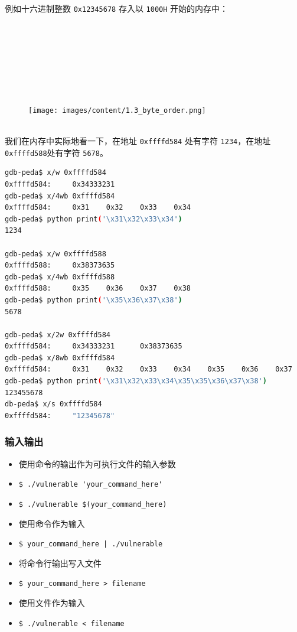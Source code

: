 \indent 例如十六进制整数 \verb+0x12345678+ 存入以 \verb+1000H+ 开始的内存中：
\indent \ \\
\indent \ \\
\indent \ \\
\indent \ \\
\indent \ \\
\indent \ \\
\indent \ \\
\begin{figure}[ht]
    \indent \\
    \texttt{[image: images/content/1.3\_byte\_order.png]}
    \label{fig:字节序}
\end{figure}
\indent \\
\indent 我们在内存中实际地看一下，在地址 \verb+0xffffd584+ 处有字符 \verb+1234+，在地址 \verb+0xffffd588+处有字符 \verb+5678+。
\begin{lstlisting}[language=bash, style=customStyleBashDark, caption=内存中的字节]
gdb-peda$ x/w 0xffffd584
0xffffd584:     0x34333231
gdb-peda$ x/4wb 0xffffd584
0xffffd584:     0x31    0x32    0x33    0x34
gdb-peda$ python print('\x31\x32\x33\x34')
1234

gdb-peda$ x/w 0xffffd588
0xffffd588:     0x38373635
gdb-peda$ x/4wb 0xffffd588
0xffffd588:     0x35    0x36    0x37    0x38
gdb-peda$ python print('\x35\x36\x37\x38')
5678

gdb-peda$ x/2w 0xffffd584
0xffffd584:     0x34333231      0x38373635
gdb-peda$ x/8wb 0xffffd584
0xffffd584:     0x31    0x32    0x33    0x34    0x35    0x36    0x37    0x38
gdb-peda$ python print('\x31\x32\x33\x34\x35\x35\x36\x37\x38')
123455678
db-peda$ x/s 0xffffd584
0xffffd584:     "12345678"
\end{lstlisting}

\subsubsection{输入输出}
\indent \setlength{\parindent}{2em}
\begin{itemize}
    \item 使用命令的输出作为可执行文件的输入参数
    \item \verb|$ ./vulnerable 'your_command_here'|
    \item \verb|$ ./vulnerable $(your_command_here)|
    \item 使用命令作为输入
    \item \verb+$ your_command_here | ./vulnerable+
    \item 将命令行输出写入文件
    \item \verb+$ your_command_here > filename+
    \item 使用文件作为输入
    \item \verb+$ ./vulnerable < filename+
\end{itemize}

